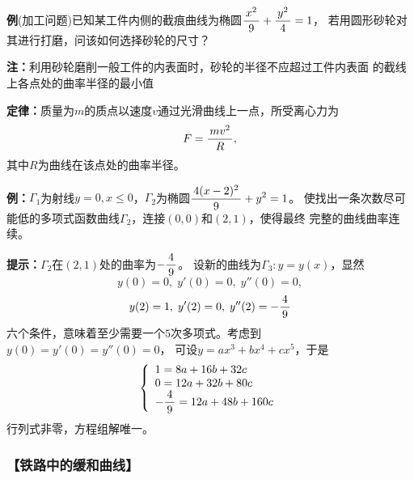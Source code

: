 {\bf 例}(加工问题)已知某工件内侧的截痕曲线为椭圆$\displaystyle\frac{\,{x^2}\,}{\,{9}\,}+\displaystyle\frac{\,{y^2}\,}{\,{4}\,}=1$，
若用圆形砂轮对其进行打磨，问该如何选择砂轮的尺寸？

{\bf 注：}利用砂轮磨削一般工件的内表面时，砂轮的半径不应超过工件内表面
的截线上各点处的曲率半径的最小值

{\bf 定律：}质量为$m$的质点以速度$v$通过光滑曲线上一点，所受离心力为
$$F=\displaystyle\frac{\,{mv^2}\,}{\,{R}\,},$$
其中$R$为曲线在该点处的曲率半径。

\begin{center}
\end{center}

{\bf 例：}$\Gamma_1$为射线$y=0,x\leq0$，$\Gamma_2$为椭圆$\displaystyle\frac{\,{4(x-2)^2}\,}{\,{9}\,}+y^2=1$。
使找出一条次数尽可能低的多项式函数曲线$\Gamma_2$，连接$(0,0)$和$(2,1)$，使得最终
完整的曲线曲率连续。

{\bf 提示：}$\Gamma_2$在$(2,1)$处的曲率为$-\displaystyle\frac{\,{4}\,}{\,{9}\,}$。
设新的曲线为$\Gamma_3:y=y(x)$，显然
$$y(0)=0,\;y'(0)=0,\;y''(0)=0,$$
$$y(2)=1,\;y'(2)=0,\;y''(2)=-\displaystyle\frac{\,{4}\,}{\,{9}\,}$$
六个条件，意味着至少需要一个$5$次多项式。考虑到$y(0)=y'(0)=y''(0)=0$，
可设$y=ax^3+bx^4+cx^5$，于是
$$
\left\{
\begin{array}{l}
1=8a+16b+32c\\
0=12a+32b+80c\\
-\displaystyle\frac{\,{4}\,}{\,{9}\,}=12a+48b+160c
\end{array}
\right.
$$
行列式非零，方程组解唯一。

\subsubsection{【铁路中的缓和曲线】}

